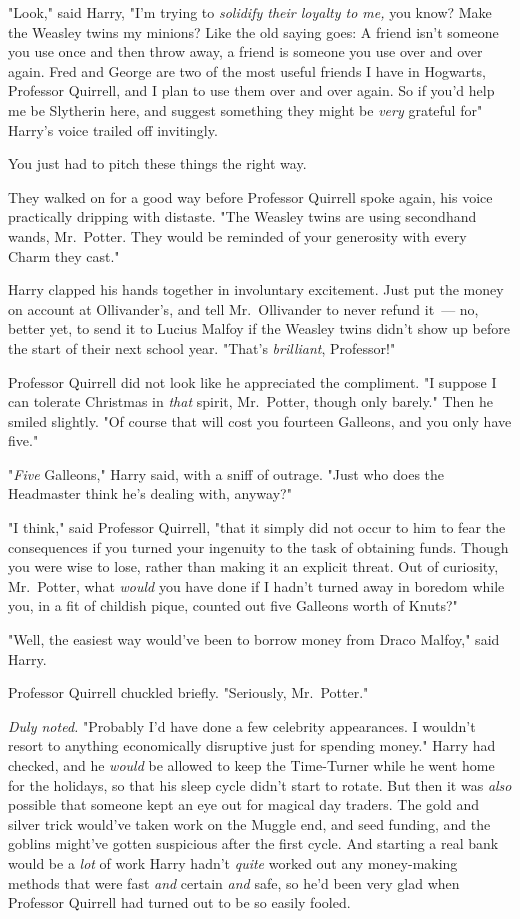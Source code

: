 "Look," said Harry, "I'm trying to \emph{solidify their loyalty to me,} you
know? Make the Weasley twins my minions? Like the old saying goes: A friend
isn't someone you use once and then throw away, a friend is someone you use
over and over again. Fred and George are two of the most useful friends I have
in Hogwarts, Professor Quirrell, and I plan to use them over and over again. So
if you'd help me be Slytherin here, and suggest something they might be
\emph{very} grateful for{\el}" Harry's voice trailed off invitingly.

You just had to pitch these things the right way.

They walked on for a good way before Professor Quirrell spoke again, his voice
practically dripping with distaste. "The Weasley twins are using secondhand
wands, Mr.~Potter. They would be reminded of your generosity with every Charm
they cast."

Harry clapped his hands together in involuntary excitement. Just put the money
on account at Ollivander's, and tell Mr.~Ollivander to never refund it~--- no,
better yet, to send it to Lucius Malfoy if the Weasley twins didn't show up
before the start of their next school year. "That's \emph{brilliant},
Professor!"

Professor Quirrell did not look like he appreciated the compliment. "I suppose
I can tolerate Christmas in \emph{that} spirit, Mr.~Potter, though only
barely." Then he smiled slightly. "Of course that will cost you fourteen
Galleons, and you only have five."

"\emph{Five} Galleons," Harry said, with a sniff of outrage. "Just who does the
Headmaster think he's dealing with, anyway?"

"I think," said Professor Quirrell, "that it simply did not occur to him to
fear the consequences if you turned your ingenuity to the task of obtaining
funds. Though you were wise to lose, rather than making it an explicit threat.
Out of curiosity, Mr.~Potter, what \emph{would} you have done if I hadn't
turned away in boredom while you, in a fit of childish pique, counted out five
Galleons worth of Knuts?"

"Well, the easiest way would've been to borrow money from Draco Malfoy," said
Harry.

Professor Quirrell chuckled briefly. "Seriously, Mr.~Potter."

\emph{Duly noted.} "Probably I'd have done a few celebrity appearances. I
wouldn't resort to anything economically disruptive just for spending money."
Harry had checked, and he \emph{would} be allowed to keep the Time-Turner while
he went home for the holidays, so that his sleep cycle didn't start to rotate.
But then it was \emph{also} possible that someone kept an eye out for magical
day traders. The gold and silver trick would've taken work on the Muggle end,
and seed funding, and the goblins might've gotten suspicious after the first
cycle. And starting a real bank would be a \emph{lot} of work{\el} Harry
hadn't \emph{quite} worked out any money-making methods that were fast
\emph{and} certain \emph{and} safe, so he'd been very glad when Professor
Quirrell had turned out to be so easily fooled.

